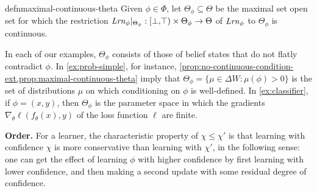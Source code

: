 \begin{linked}{defn}{maximal-continuous-theta}
	Given $\phi \in \Phi$, let $\Theta_\phi \subseteq \Theta$ be the maximal set 
	open set for which the restriction
	$
	\mathit{Lrn}_{\phi} |_{\Theta_\phi} : 
		[\bot,\!\top) \times \Theta_\phi \to \Theta
	$		
	of 
	$\mathit{Lrn}_\phi$
	to $\Theta_\phi$ is continuous. 	
\end{linked}
In each of our examples, $\Theta_\phi$ consists of those
of belief states that do not flatly contradict $\phi$.
In \cref{ex:prob-simple}, 
for instance, \cref{prop:no-continuous-condition-ext,prop:maximal-continuous-theta}
imply that $\Theta_\phi = \{ \mu \in \Delta W : \mu(\phi) > 0\}$
is the set of distributions $\mu$ on which conditioning on $\phi$ is well-defined.
In \cref{ex:classifier}, if $\phi=(x,y)$, then $\Theta_{\phi}$ is the parameter space in which the gradients $\nabla_{\theta}\ell(f_\theta(x), y)$ of the loss function $\ell$ are finite.
 
 \textbf{Order.}
 For a learner,
 	the characteristic property of $\chi \le \chi'$ is that
 	learning with confidence $\chi$ is more conservative than learning with $\chi'$,
 	in the following sense:
 	one can get the effect of learning $\phi$ with higher confidence by first learning with lower confidence, and then making a second update with some residual degree of confidence.


